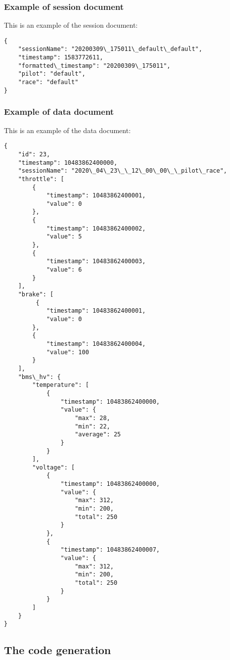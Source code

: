 \subsubsection{Example of session document}

This is an example of the session document:

\begin{verbatim}
{
    "sessionName": "20200309\_175011\_default\_default",
    "timestamp": 1583772611,
    "formatted\_timestamp": "20200309\_175011",
    "pilot": "default",
    "race": "default"
}
\end{verbatim}

\subsubsection{Example of data document}

This is an example of the data document:

\begin{verbatim}
{
    "id": 23,
    "timestamp": 10483862400000,
    "sessionName": "2020\_04\_23\_\_12\_00\_00\_\_pilot\_race",
    "throttle": [
        {
            "timestamp": 10483862400001,
            "value": 0
        },
        {
            "timestamp": 10483862400002,
            "value": 5
        },
        {
            "timestamp": 10483862400003,
            "value": 6
        }
    ],
    "brake": [
         {
            "timestamp": 10483862400001,
            "value": 0
        },
        {
            "timestamp": 10483862400004,
            "value": 100
        }
    ],
    "bms\_hv": {
        "temperature": [
            {
                "timestamp": 10483862400000,
                "value": {
                    "max": 28,
                    "min": 22,
                    "average": 25
                }
            }
        ],
        "voltage": [
            {
                "timestamp": 10483862400000,
                "value": {
                    "max": 312,
                    "min": 200,
                    "total": 250
                }
            },
            {
                "timestamp": 10483862400007,
                "value": {
                    "max": 312,
                    "min": 200,
                    "total": 250
                }
            }
        ]
    }
}
\end{verbatim}

\subsection{The code generation}

